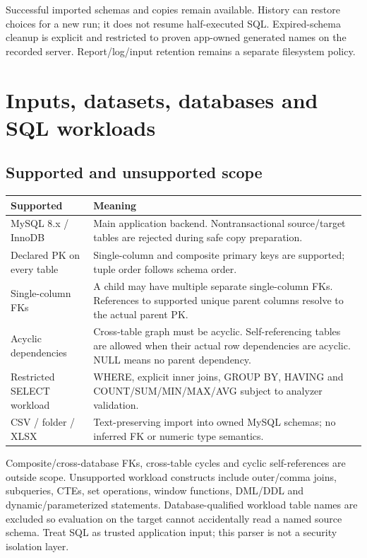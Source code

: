 \documentclass[11pt,a4paper,oneside]{report}
\begin{document}
Successful imported schemas and copies remain available. History can restore choices for a new run; it does not resume half-executed SQL. Expired-schema cleanup is explicit and restricted to proven app-owned generated names on the recorded server. Report/log/input retention remains a separate filesystem policy.

\chapter{Inputs, datasets, databases and SQL workloads}
\section{Supported and unsupported scope}
\begin{longtable}{>{\RaggedRight\arraybackslash}p{.25\linewidth}>{\RaggedRight\arraybackslash}p{.67\linewidth}}
\toprule\textbf{Supported} & \textbf{Meaning}\\\midrule\endhead
MySQL 8.x / InnoDB & Main application backend. Nontransactional source/target tables are rejected during safe copy preparation.\\[4pt]
Declared PK on every table & Single-column and composite primary keys are supported; tuple order follows schema order.\\[4pt]
Single-column FKs & A child may have multiple separate single-column FKs. References to supported unique parent columns resolve to the actual parent PK.\\[4pt]
Acyclic dependencies & Cross-table graph must be acyclic. Self-referencing tables are allowed when their actual row dependencies are acyclic. NULL means no parent dependency.\\[4pt]
Restricted SELECT workload & WHERE, explicit inner joins, GROUP BY, HAVING and COUNT/SUM/MIN/MAX/AVG subject to analyzer validation.\\[4pt]
CSV / folder / XLSX & Text-preserving import into owned MySQL schemas; no inferred FK or numeric type semantics.\\\bottomrule
\end{longtable}

Composite/cross-database FKs, cross-table cycles and cyclic self-references are outside scope. Unsupported workload constructs include outer/comma joins, subqueries, CTEs, set operations, window functions, DML/DDL and dynamic/parameterized statements. Database-qualified workload table names are excluded so evaluation on the target cannot accidentally read a named source schema. Treat SQL as trusted application input; this parser is not a security isolation layer.
\end{document}
